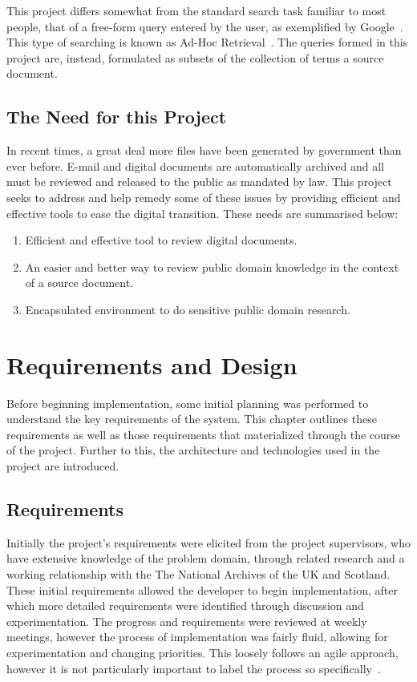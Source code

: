 \documentclass{l4proj}
\begin{document}
This project differs somewhat from the standard search task familiar to most people, that of a free-form query entered by the user, as exemplified by Google~\cite{google}. This type of searching is known as Ad-Hoc Retrieval~\cite{baeza1999modern}. The queries formed in this project are, instead, formulated as subsets of the collection of terms a source document.
\section{The Need for this Project} \label{needs}
In recent times, a great deal more files have been generated by government than ever before. E-mail and digital documents are automatically archived and all must be reviewed and released to the public as mandated by law.
This project seeks to address and help remedy some of these issues by providing efficient and effective tools to ease the digital transition.
These needs are summarised below:
\begin{enumerate}[label=\textbf{Need.\arabic*}]
\item Efficient and effective tool to review digital documents.
\item An easier and better way to review public domain knowledge in the context of a source document.
\item Encapsulated environment to do sensitive public domain research.
\end{enumerate}

\chapter{Requirements and Design} \label{requirementsanddesign}
Before beginning implementation, some initial planning was performed to understand the key requirements of the system. This chapter outlines these requirements as well as those requirements that materialized through the course of the project. Further to this, the architecture and technologies used in the project are introduced.
\section{Requirements}
Initially the project's requirements were elicited from the project supervisors, who have extensive knowledge of the problem domain, through related research and a working relationship with the The National Archives of the UK and Scotland.
These initial requirements allowed the developer to begin implementation, after which more detailed requirements were identified through discussion and experimentation. The progress and requirements were reviewed at weekly meetings, however the process of implementation was fairly fluid, allowing for experimentation and changing priorities. This loosely follows an agile approach, however it is not particularly important to label the process so specifically~\cite{Sommerville:2010:SE:1841764}.
\end{document}
